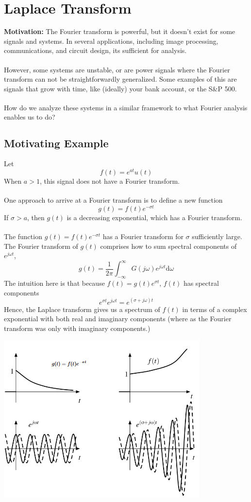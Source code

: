 \documentclass[10pt]{article}
\newcommand{\absint}{\int_{-\infty}^\infty}
\newcommand{\dd}{\text{d}}
\begin{document}
\section*{Laplace Transform}
\textbf{Motivation:}
The Fourier transform is powerful, but it doesn't exist for some signals and systems. In several applications, including image processing, communications, and circuit design, its sufficient for analysis.\\\\
However, some systems are unstable, or are power signals where the Fourier transform can not be straightforwardly generalized. Some examples of this are signals that grow with time, like (ideally) your bank account, or the S\&P 500.\\\\
How do we analyze these systems in a similar framework to what Fourier analysis enables us to do?

\subsection*{Motivating Example}
Let
\[f(t) = e^{at} u(t)\]
When $a > 1$, this signal does not have a Fourier transform.\\\\
One approach to arrive at a Fourier transform is to define a new function
\[g(t) = f(t) e^{-\sigma t}\]
If $\sigma > a$, then $g(t)$ is a decreasing exponential, which has a Fourier transform.\\\\
The function $g(t) = f(t) e^{-\sigma t}$ has a Fourier transform for $\sigma$ sufficiently large.  The Fourier transform of $g(t)$ comprises how to sum spectral components of $e^{j\omega t}$,
\[g(t) = \frac{1}{2\pi} \absint G(j\omega) e^{j\omega t} \dd \omega\] 
The intuition here is that because $f(t) = g(t) e^{\sigma t}$, $f(t)$ has spectral components
\[e^{\sigma t} e^{j\omega t} = e^{(\sigma + j\omega)t}\]
Hence, the Laplace transform gives us a spectrum of $f(t)$ in terms of a complex exponential with both real and imaginary components (where as the Fourier transform was only with imaginary components.)
\begin{center}
    \includegraphics*[scale=0.8]{W8_20.png}
\end{center}
\end{document}
